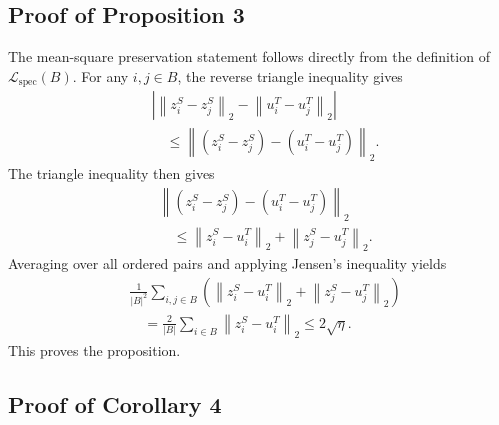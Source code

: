 \subsection{Proof of Proposition 3}

The mean-square preservation statement follows directly from the definition of $\mathcal{L}_{\mathrm{spec}}(B)$. For any $i,j\in B$, the reverse triangle inequality gives
\begin{equation}
\begin{aligned}
&\left|\left\|z_i^S-z_j^S\right\|_2
-\left\|u_i^T-u_j^T\right\|_2\right|\\
&\quad\le
\left\|(z_i^S-z_j^S)-(u_i^T-u_j^T)\right\|_2.
\end{aligned}
\end{equation}
The triangle inequality then gives
\begin{equation}
\begin{aligned}
&\left\|(z_i^S-z_j^S)-(u_i^T-u_j^T)\right\|_2\\
&\quad\le
\left\|z_i^S-u_i^T\right\|_2
+
\left\|z_j^S-u_j^T\right\|_2.
\end{aligned}
\end{equation}
Averaging over all ordered pairs and applying Jensen's inequality yields
\begin{equation}
\begin{aligned}
&\frac{1}{|B|^2}\sum_{i,j\in B}
\left(\left\|z_i^S-u_i^T\right\|_2
+
\left\|z_j^S-u_j^T\right\|_2\right)\\
&\quad=
\frac{2}{|B|}\sum_{i\in B}
\left\|z_i^S-u_i^T\right\|_2
\le
2\sqrt{\eta}.
\end{aligned}
\end{equation}
This proves the proposition.

\subsection{Proof of Corollary 4}

